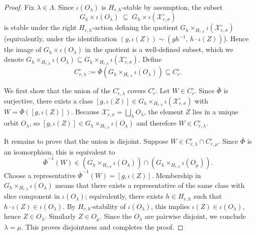 \documentclass{article}
\theoremstyle{definition}
\begin{document}
\begin{proof}
Fix $\lambda\in\Lambda$. Since $\iota(O_\lambda)$ is $H_{r,h}$-stable by assumption, the subset
\[
G_h\times \iota(O_\lambda)\;\subseteq\; G_h\times \iota(\mathcal X_{r,\sigma}^{\circ})
\]
is stable under the right $H_{r,h}$-action defining the quotient $G_h\times_{H_{r,h}}\iota(\mathcal X_{r,\sigma}^{\circ})$ (equivalently, under the identification
$(g,\iota(Z))\sim (gh^{-1},\,h\cdot \iota(Z))$). Hence the image of $G_h\times \iota(O_\lambda)$ in the quotient is a well-defined subset, which we denote
$G_h\times_{H_{r,h}} \iota(O_\lambda) \subseteq G_h\times_{H_{r,h}}\iota(\mathcal X_{r,\sigma}^{\circ})$.
Define
\[
C_{r,\lambda}^{\circ}:=\bar\Phi\!\left(G_h\times_{H_{r,h}} \iota(O_\lambda)\right)\subseteq C_r^{\circ}.
\]

We first show that the union of the $C_{r,\lambda}^{\circ}$ covers $C_r^{\circ}$.
Let $W\in C_r^{\circ}$. Since $\bar\Phi$ is surjective, there exists a class $[g,\iota(Z)]\in G_h\times_{H_{r,h}}\iota(\mathcal X_{r,\sigma}^{\circ})$
with $W=\bar\Phi([g,\iota(Z)])$. Because $\mathcal X_{r,\sigma}^{\circ}=\bigsqcup_{\lambda} O_\lambda$, the element $Z$ lies in a unique orbit $O_\lambda$,
so $[g,\iota(Z)]\in G_h\times_{H_{r,h}}\iota(O_\lambda)$ and therefore $W\in C_{r,\lambda}^{\circ}$.

It remains to prove that the union is disjoint.
Suppose $W\in C_{r,\lambda}^{\circ}\cap C_{r,\mu}^{\circ}$. Since $\bar\Phi$ is an isomorphism, this is equivalent to
\[
\bar\Phi^{-1}(W)\in \left(G_h\times_{H_{r,h}}\iota(O_\lambda)\right)\cap \left(G_h\times_{H_{r,h}}\iota(O_\mu)\right).
\]
Choose a representative $\bar\Phi^{-1}(W)=[g,\iota(Z)]$. Membership in $G_h\times_{H_{r,h}}\iota(O_\lambda)$ means that there exists a representative
of the same class with slice component in $\iota(O_\lambda)$; equivalently, there exists $h\in H_{r,h}$ such that
$h\cdot \iota(Z)\in \iota(O_\lambda)$. By $H_{r,h}$-stability of $\iota(O_\lambda)$, this implies $\iota(Z)\in \iota(O_\lambda)$, hence $Z\in O_\lambda$.
Similarly $Z\in O_\mu$. Since the $O_\lambda$ are pairwise disjoint, we conclude $\lambda=\mu$. This proves disjointness and completes the proof.
\end{proof}
\end{document}
